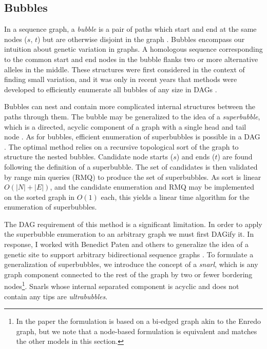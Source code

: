 \documentclass[a4paper,12pt,numbered,oneside]{Classes/PhDThesisPSnPDF}
\begin{document}
\subsection{Bubbles}

In a sequence graph, a \emph{bubble} is a pair of paths which start and end at the same nodes ($s$, $t$) but are otherwise disjoint in the graph \cite{zerbino2008velvet}.
Bubbles encompass our intuition about genetic variation in graphs.
A homologous sequence corresponding to the common start and end nodes in the bubble flanks two or more alternative alleles in the middle.
These structures were first considered in the context of finding small variation, and it was only in recent years that methods were developed to efficiently enumerate all bubbles of any size in DAGs \cite{birmele2012efficient}.

Bubbles can nest and contain more complicated internal structures between the paths through them.
The bubble may be generalized to the idea of a \emph{superbubble}, which is a directed, acyclic component of a graph with a single head and tail node \cite{onodera2013detecting}.
As for bubbles, efficient enumeration of superbubbles is possible in a DAG \cite{brankovic2016linear}.
The optimal method relies on a recursive topological sort of the graph to structure the nested bubbles.
Candidate node starts ($s$) and ends ($t$) are found following the definition of a superbubble.
The set of candidates is then validated by range min queries (RMQ) to produce the set of superbubbles.
As sort is linear $O(|N| + |E|)$, and the candidate enumeration and RMQ may be implemented on the sorted graph in $O(1)$ each, this yields a linear time algorithm for the enumeration of superbubbles.

The DAG requirement of this method is a significant limitation.
In order to apply the superbubble enumeration to an arbitrary graph we must first DAGify it.
In response, I worked with Benedict Paten and others to generalize the idea of a genetic site to support arbitrary bidirectional sequence graphs \cite{paten2018superbubbles}.
To formulate a generalization of superbubbles, we introduce the concept of a \emph{snarl}, which is any graph component connected to the rest of the graph by two or fewer bordering nodes\footnote{In the paper the formulation is based on a bi-edged graph akin to the Enredo graph, but we note that a node-based formulation is equivalent and matches the other models in this section.}.
Snarls whose internal separated component is acyclic and does not contain any tips are \emph{ultrabubbles}.
\end{document}
